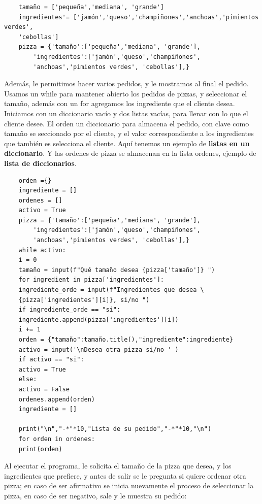 \begin{lstlisting}
	tamaño = ['pequeña','mediana', 'grande']
	ingredientes'= ['jamón','queso','champiñones','anchoas','pimientos verdes', 
	'cebollas']
	pizza = {'tamaño':['pequeña','mediana', 'grande'],
		'ingredientes':['jamón','queso','champiñones',
		'anchoas','pimientos verdes', 'cebollas'],} 
\end{lstlisting}

Además, le permitimos hacer varios pedidos, y le mostramos al final el pedido.
Usamos un {\ttfamily while} para mantener abierto los pedidos de pizzas, y seleccionar el tamaño, además con un {\ttfamily for} agregamos los ingrediente que el cliente desea. Iniciamos con un diccionario vacío  y dos listas vacías, para llenar con lo que el cliente desee. El {\ttfamily orden} un diccionario para almacena el pedido, con clave como tamaño se seccionado por el cliente, y el valor correspondiente a los ingredientes que también es selecciona el cliente.  Aquí tenemos un ejemplo de  {\bf listas en un diccionario}.   Y las ordenes de pizza se almacenan en la lista {\ttfamily ordenes}, ejemplo de {\bf lista de diccionarios}.

\hspace{-2.5cm}{\ttfamily \scriptsize pizza.py}  \vspace{-0.5cm}
\begin{lstlisting}
	orden ={}
	ingrediente = []
	ordenes = []
	activo = True
	pizza = {'tamaño':['pequeña','mediana', 'grande'],
		'ingredientes':['jamón','queso','champiñones',
		'anchoas','pimientos verdes', 'cebollas'],}
	while activo:
	i = 0
	tamaño = input(f"Qué tamaño desea {pizza['tamaño']} ")
	for ingredient in pizza['ingredientes']:
	ingrediente_orde = input(f"Ingredientes que desea \
	{pizza['ingredientes'][i]}, si/no ")
	if ingrediente_orde == "si":
	ingrediente.append(pizza['ingredientes'][i])
	i += 1
	orden = {"tamaño":tamaño.title(),"ingrediente":ingrediente}
	activo = input('\nDesea otra pizza si/no ' )
	if activo == "si":
	activo = True
	else:
	activo = False
	ordenes.append(orden)
	ingrediente = []
	
	print("\n","-*"*10,"Lista de su pedido","-*"*10,"\n")
	for orden in ordenes:
	print(orden)    
\end{lstlisting}

Al ejecutar el programa, le solicita el tamaño de la pizza que desea, y los ingredientes que prefiere, y antes de salir se le pregunta si quiere ordenar otra pizza; en caso de ser afirmativo se inicia nuevamente el proceso de seleccionar la pizza, en caso de ser negativo, sale y le muestra su pedido:


